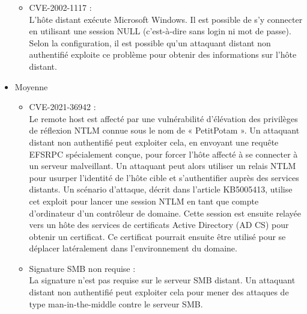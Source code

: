 \documentclass[a4paper]{article}
\begin{document}
\begin{itemize}
\begin{itemize}
        \item CVE-2002-1117 :\\
        L'hôte distant exécute Microsoft Windows. Il est possible de s'y connecter en utilisant une session NULL (c'est-à-dire sans login ni mot de passe). Selon la configuration, il est possible qu'un attaquant distant non authentifié exploite ce problème pour obtenir des informations sur l'hôte distant. 
    \end{itemize}
    \item Moyenne
    \begin{itemize}
        \item CVE-2021-36942 :\\
        Le remote host est affecté par une vulnérabilité d'élévation des privilèges de réflexion NTLM connue sous le nom de « PetitPotam ». Un attaquant distant non authentifié peut exploiter cela, en envoyant une requête EFSRPC spécialement conçue, pour forcer l'hôte affecté à se connecter à un serveur malveillant. Un attaquant peut alors utiliser un relais NTLM pour usurper l'identité de l'hôte cible et s'authentifier auprès des services distants. Un scénario d'attaque, décrit dans l'article KB5005413, utilise cet exploit pour lancer une session NTLM en tant que compte d'ordinateur d'un contrôleur de domaine. Cette session est ensuite relayée vers un hôte des services de certificats Active Directory (AD CS) pour obtenir un certificat. Ce certificat pourrait ensuite être utilisé pour se déplacer latéralement dans l'environnement du domaine.
        \item Signature SMB non requise :\\
        La signature n'est pas requise sur le serveur SMB distant. Un attaquant distant non authentifié peut exploiter cela pour mener des attaques de type man-in-the-middle contre le serveur SMB.
    \end{itemize}
\end{itemize}
\end{document}
